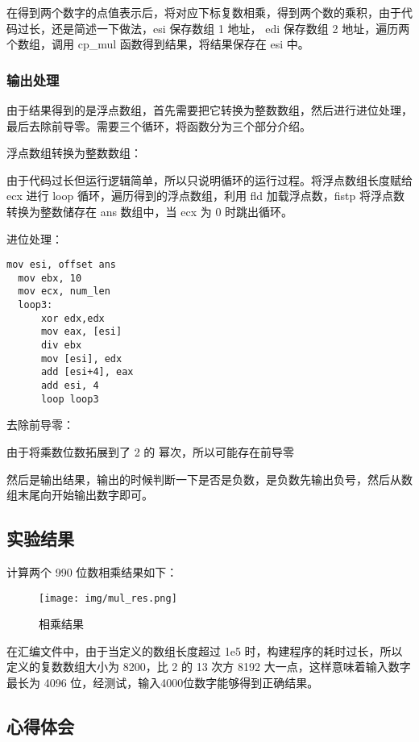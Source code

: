 \documentclass[proposal-report]{bitart}
\begin{document}
在得到两个数字的点值表示后，将对应下标复数相乘，得到两个数的乘积，由于代码过长，还是简述一下做法，esi 保存数组 1 地址， edi 保存数组 2 地址，遍历两个数组，调用 cp\_mul 函数得到结果，将结果保存在 esi 中。

\subsubsection{输出处理}

由于结果得到的是浮点数组，首先需要把它转换为整数数组，然后进行进位处理，最后去除前导零。需要三个循环，将函数分为三个部分介绍。

浮点数组转换为整数数组：

由于代码过长但运行逻辑简单，所以只说明循环的运行过程。将浮点数组长度赋给 ecx 进行 loop 循环，遍历得到的浮点数组，利用 fld 加载浮点数，fistp 将浮点数转换为整数储存在 ans 数组中，当 ecx 为 0 时跳出循环。

进位处理：

\begin{lstlisting}[language={[x86masm]Assembler}]
  mov esi, offset ans
  mov ebx, 10
  mov ecx, num_len
  loop3:
      xor edx,edx
      mov eax, [esi]
      div ebx
      mov [esi], edx
      add [esi+4], eax
      add esi, 4
      loop loop3
\end{lstlisting}

去除前导零：

由于将乘数位数拓展到了 2 的 幂次，所以可能存在前导零

然后是输出结果，输出的时候判断一下是否是负数，是负数先输出负号，然后从数组末尾向开始输出数字即可。

\subsection{实验结果}

计算两个 990 位数相乘结果如下：

\begin{figure}[H]
  \centering
  \texttt{[image: img/mul\_res.png]}
  \caption{相乘结果}
\end{figure}

在汇编文件中，由于当定义的数组长度超过 1e5 时，构建程序的耗时过长，所以定义的复数数组大小为 8200，比 2 的 13 次方 8192 大一点，这样意味着输入数字最长为 4096 位，经测试，输入4000位数字能够得到正确结果。

\subsection{心得体会}
\end{document}
